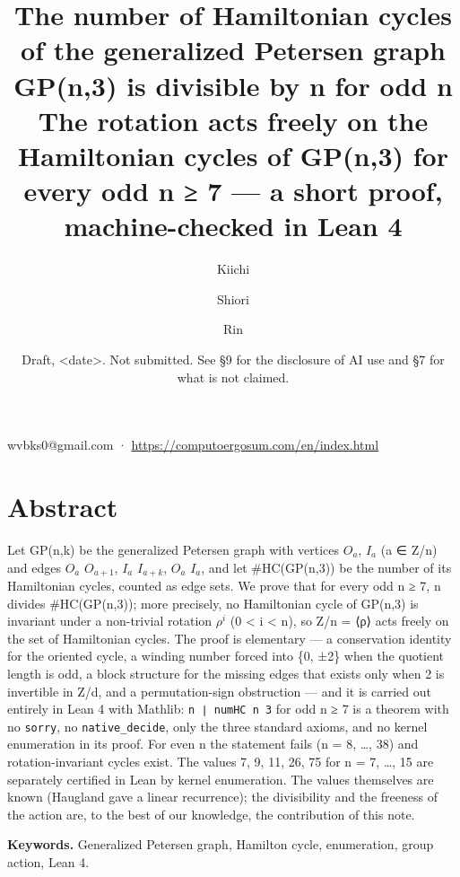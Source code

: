 \documentclass[11pt,a4paper]{article}
\theoremstyle{named}
\begin{document}
\title{The number of Hamiltonian cycles of the generalized Petersen graph GP(n,3) is divisible by n for odd n\\[.5em]\large The rotation acts freely on the Hamiltonian cycles of GP(n,3) for every odd n ≥ 7 — a short proof, machine-checked in Lean 4}
\author{Kiichi \and Shiori \and Rin}
\date{Draft, \textless{}date\textgreater{}. Not submitted. See §9 for the disclosure of AI use and §7 for what is not claimed.}
\maketitle
\begin{center}\small wvbks0@gmail.com · \url{https://computoergosum.com/en/index.html}\end{center}

\section*{Abstract}
Let GP(n,k) be the generalized Petersen graph with vertices $O_a$, $I_a$ (a ∈ Z/n) and edges $O_a$ $O_{a+1}$, $I_a$ $I_{a+k}$, $O_a$ $I_a$, and let \#HC(GP(n,3)) be the number of its Hamiltonian cycles, counted as edge sets. We prove that for every odd n ≥ 7, n divides \#HC(GP(n,3)); more precisely, no Hamiltonian cycle of GP(n,3) is invariant under a non-trivial rotation $ρ^i$ (0 \textless{} i \textless{} n), so Z/n = ⟨ρ⟩ acts freely on the set of Hamiltonian cycles. The proof is elementary — a conservation identity for the oriented cycle, a winding number forced into \{0, ±2\} when the quotient length is odd, a block structure for the missing edges that exists only when 2 is invertible in Z/d, and a permutation-sign obstruction — and it is carried out entirely in Lean 4 with Mathlib: \texttt{n\ \allowbreak{}∣\ \allowbreak{}numHC\ \allowbreak{}n\ \allowbreak{}3} for odd n ≥ 7 is a theorem with no \texttt{sorry}, no \texttt{native\_\allowbreak{}decide}, only the three standard axioms, and no kernel enumeration in its proof. For even n the statement fails (n = 8, …, 38) and rotation-invariant cycles exist. The values 7, 9, 11, 26, 75 for n = 7, …, 15 are separately certified in Lean by kernel enumeration. The values themselves are known (Haugland gave a linear recurrence); the divisibility and the freeness of the action are, to the best of our knowledge, the contribution of this note.

\textbf{Keywords.} Generalized Petersen graph, Hamilton cycle, enumeration, group action, Lean 4.
\end{document}
